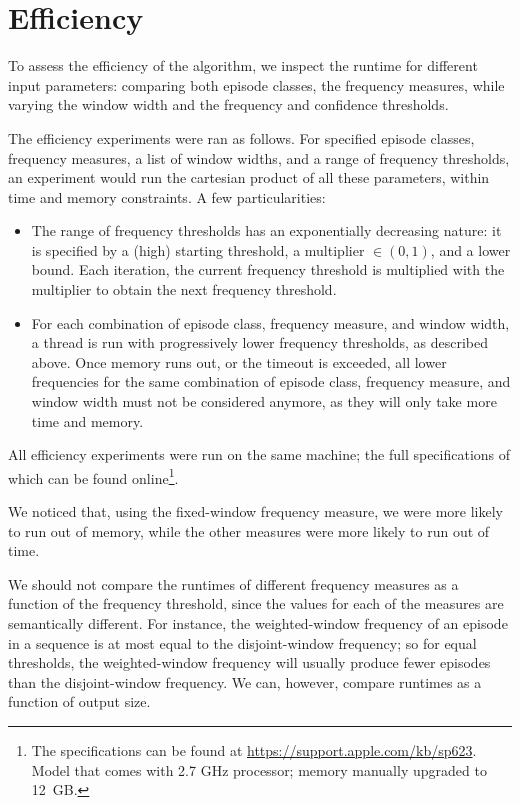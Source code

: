 \section{Efficiency}

To assess the efficiency of the algorithm, we inspect the runtime for different input parameters: comparing both episode classes, the frequency measures, while varying the window width and the frequency and confidence thresholds.

The efficiency experiments were ran as follows. For specified episode classes, frequency measures, a list of window widths, and a range of frequency thresholds, an experiment would run the cartesian product of all these parameters, within time and memory constraints. A few particularities:

\begin{itemize}
\item The range of frequency thresholds has an exponentially decreasing nature: it is specified by a (high) starting threshold, a multiplier $ \in (0, 1) $, and a lower bound. Each iteration, the current frequency threshold is multiplied with the multiplier to obtain the next frequency threshold.
\item For each combination of episode class, frequency measure, and window width, a thread is run with progressively lower frequency thresholds, as described above. Once memory runs out, or the timeout is exceeded, all lower frequencies for the same combination of episode class, frequency measure, and window width must not be considered anymore, as they will only take more time and memory.
\end{itemize}

All efficiency experiments were run on the same machine; the full specifications of which can be found online\footnote{The specifications can be found at \url{https://support.apple.com/kb/sp623}. Model that comes with 2.7 GHz processor; memory manually upgraded to 12~GB.}.

We noticed that, using the fixed-window frequency measure, we were more likely to run out of memory, while the other measures were more likely to run out of time.

We should not compare the runtimes of different frequency measures as a function of the frequency threshold, since the values for each of the measures are semantically different. For instance, the weighted-window frequency of an episode in a sequence is at most equal to the disjoint-window frequency; so for equal thresholds, the weighted-window frequency will usually produce fewer episodes than the disjoint-window frequency. We can, however, compare runtimes as a function of output size.


